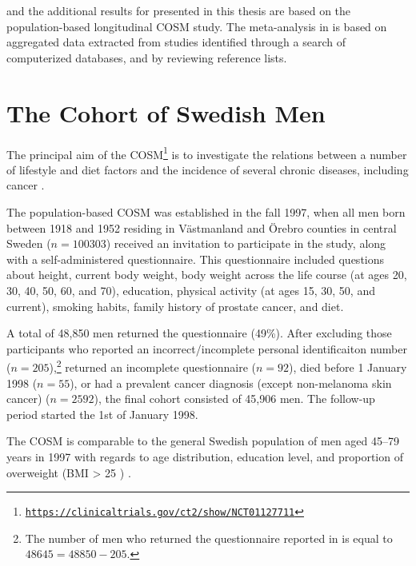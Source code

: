 %

 and the additional results for  presented in this thesis are based on the population-based longitudinal COSM study. The meta-analysis in  is based on aggregated data extracted from studies identified through a search of computerized databases, and by reviewing reference lists.

\section{The Cohort of Swedish Men}
\label{section:cosm}
The principal aim of the COSM\footnote{\href{https://clinicaltrials.gov/ct2/show/NCT01127711}{\texttt{https://clinicaltrials.gov/ct2/show/NCT01127711}}} is to investigate the relations between a number of lifestyle and diet factors and the incidence of several chronic diseases, including cancer \citep{harris_swedish_2013}.

The population-based COSM was established in the fall 1997, when all men born between 1918 and 1952 residing in Västmanland and Örebro counties in central Sweden ($n= 100303$) received an invitation to participate in the study, along with a self-administered questionnaire. This questionnaire included questions about height, current body weight, body weight across the life course (at ages 20, 30, 40, 50, 60, and 70), education, physical activity (at ages 15, 30, 50, and current), smoking habits, family history of prostate cancer, and diet.

A total of 48,850 men returned the questionnaire (49\%). After excluding those participants who reported an incorrect/incomplete personal identificaiton number ($n= 205$),\footnote{The number of men who returned the questionnaire reported in  is equal to $48645=48850-205$.} returned an incomplete questionnaire ($n= 92$),  died before 1 January 1998 ($n= 55$), or had a prevalent cancer diagnosis (except non-melanoma skin cancer) ($n= 2592$), the final cohort consisted of 45,906 men. The follow-up period started the 1st of January 1998.

The COSM is comparable to the general Swedish population of men aged 45--79 years in 1997 with regards to age distribution, education level, and proportion of overweight (BMI > 25 \kgmsq) \citep[see table \ref{tab:cosmswedishpop}, reproduced from][]{harris_swedish_2013}. %

